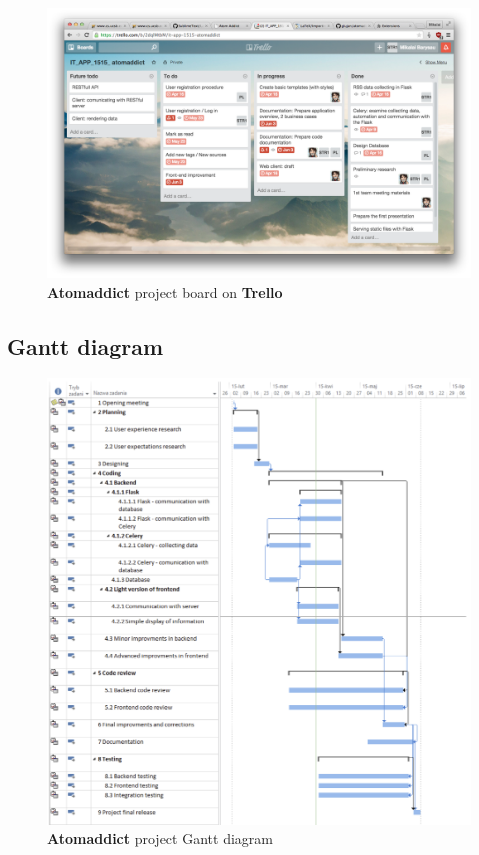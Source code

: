 \documentclass[12pt]{article}
\begin{document}
\begin{figure}[H]
    \centering
    \includegraphics[width=\textwidth]{images/trello.png}
    \caption{\textbf{Atomaddict} project board on \textbf{Trello}}
    \label{fig:trello}
\end{figure}


\subsection{Gantt diagram}

\begin{figure}[H]
    \centering
    \includegraphics[width=\textwidth]{images/gantt.png}
    \caption{\textbf{Atomaddict} project Gantt diagram}
\end{figure}
\end{document}
